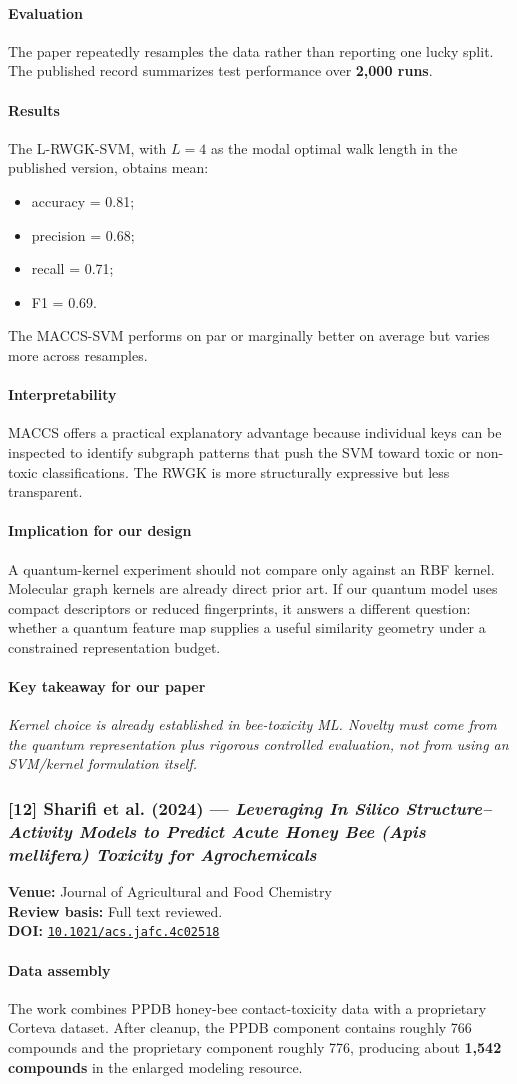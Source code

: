 \documentclass[11pt]{article}
\newcommand{\reviewfield}[2]{\paragraph{#1}#2}
\newcommand{\keytakeaway}[1]{\paragraph{Key takeaway for our paper}\emph{#1}}
\newcommand{\paperdoi}[1]{\href{https://doi.org/#1}{\texttt{#1}}}
\begin{document}
\reviewfield{Evaluation}{
The paper repeatedly resamples the data rather than reporting one lucky split. The published record summarizes test performance over \textbf{2,000 runs}.
}

\reviewfield{Results}{
The L-RWGK-SVM, with $L=4$ as the modal optimal walk length in the published version, obtains mean:
\begin{itemize}
    \item accuracy = 0.81;
    \item precision = 0.68;
    \item recall = 0.71;
    \item F1 = 0.69.
\end{itemize}
The MACCS-SVM performs on par or marginally better on average but varies more across resamples.
}

\reviewfield{Interpretability}{
MACCS offers a practical explanatory advantage because individual keys can be inspected to identify subgraph patterns that push the SVM toward toxic or non-toxic classifications. The RWGK is more structurally expressive but less transparent.
}

\reviewfield{Implication for our design}{
A quantum-kernel experiment should not compare only against an RBF kernel. Molecular graph kernels are already direct prior art. If our quantum model uses compact descriptors or reduced fingerprints, it answers a different question: whether a quantum feature map supplies a useful similarity geometry under a constrained representation budget.
}

\keytakeaway{Kernel choice is already established in bee-toxicity ML. Novelty must come from the quantum representation plus rigorous controlled evaluation, not from using an SVM/kernel formulation itself.}

\subsubsection{[12] Sharifi et al. (2024) --- \textit{Leveraging In Silico Structure--Activity Models to Predict Acute Honey Bee (Apis mellifera) Toxicity for Agrochemicals}}
\textbf{Venue:} Journal of Agricultural and Food Chemistry\\
\textbf{Review basis:} Full text reviewed.\\
\textbf{DOI:} \paperdoi{10.1021/acs.jafc.4c02518}

\reviewfield{Data assembly}{
The work combines PPDB honey-bee contact-toxicity data with a proprietary Corteva dataset. After cleanup, the PPDB component contains roughly 766 compounds and the proprietary component roughly 776, producing about \textbf{1,542 compounds} in the enlarged modeling resource.
}
\end{document}
